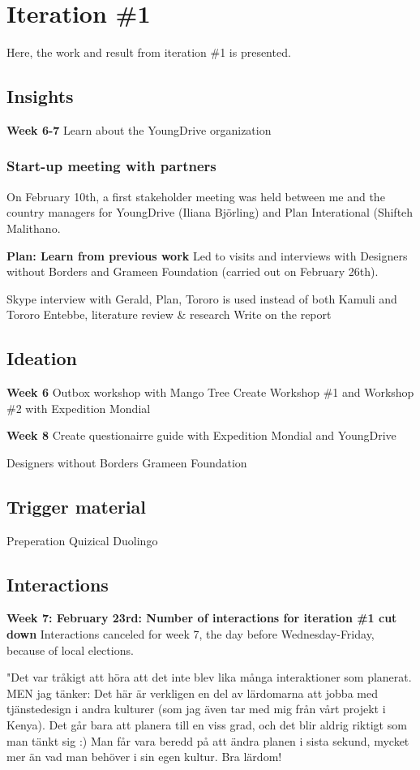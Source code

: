 \section{Iteration \#1}
Here, the work and result from iteration \#1 is presented.

\subsection*{Insights}
\textbf{Week 6-7}
Learn about the YoungDrive organization

\subsubsection{Start-up meeting with partners}
On February 10th, a first stakeholder meeting was held between me and the country managers for YoungDrive (Iliana Björling) and Plan Interational (Shifteh Malithano.

\textbf{Plan: Learn from previous work}
Led to visits and interviews with Designers without Borders and Grameen Foundation (carried out on February 26th).

Skype interview with Gerald, Plan, Tororo is used instead of both Kamuli and Tororo
Entebbe, literature review \& research
Write on the report

\subsection*{Ideation}
\textbf{Week 6}
Outbox workshop with Mango Tree
Create Workshop \#1 and Workshop \#2 with Expedition Mondial

\textbf{Week 8}
Create questionairre guide with Expedition Mondial and YoungDrive

Designers without Borders
Grameen Foundation

\subsection*{Trigger material}
Preperation
Quizical
Duolingo

\subsection*{Interactions}
\textbf{Week 7: February 23rd: Number of interactions for iteration \#1 cut down}
Interactions canceled for week 7, the day before Wednesday-Friday, because of local elections.

"Det var tråkigt att höra att det inte blev lika många interaktioner som planerat.
MEN jag tänker: Det här är verkligen en del av lärdomarna att jobba med tjänstedesign i andra kulturer (som jag även tar med mig från vårt projekt i Kenya). Det går bara att planera till en viss grad, och det blir aldrig riktigt som man tänkt sig :) Man får vara beredd på att ändra planen i sista sekund, mycket mer än vad man behöver i sin egen kultur. Bra lärdom!


